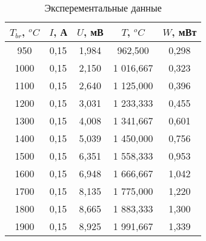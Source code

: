 \begin{table}[]
    \centering
    \begin{tabular}{|c|c|c|c|c|}
    \hline
    $T_{br}$, $^oC$   & $I$, А    & $U$, мВ     & $T$, $^oC$         & $W$, мВт       \\ \hline
    950               & 0,15        & 1,984       & 962,500            & 0,298        \\ \hline
    1000              & 0,15        & 2,150       & 1 016,667          & 0,323        \\ \hline
    1100              & 0,15        & 2,640       & 1 125,000          & 0,396        \\ \hline
    1200              & 0,15        & 3,031       & 1 233,333          & 0,455        \\ \hline
    1300              & 0,15        & 4,008       & 1 341,667          & 0,601        \\ \hline
    1400              & 0,15        & 5,039       & 1 450,000          & 0,756        \\ \hline
    1500              & 0,15        & 6,351       & 1 558,333          & 0,953        \\ \hline
    1600              & 0,15        & 6,948       & 1 666,667          & 1,042        \\ \hline
    1700              & 0,15        & 8,135       & 1 775,000          & 1,220        \\ \hline
    1800              & 0,15        & 8,665       & 1 883,333          & 1,300        \\ \hline
    1900              & 0,15        & 8,925       & 1 991,667          & 1,339        \\ \hline
    \end{tabular}
    \caption{Эксперементальные данные}
    \label{table:1}
\end{table}